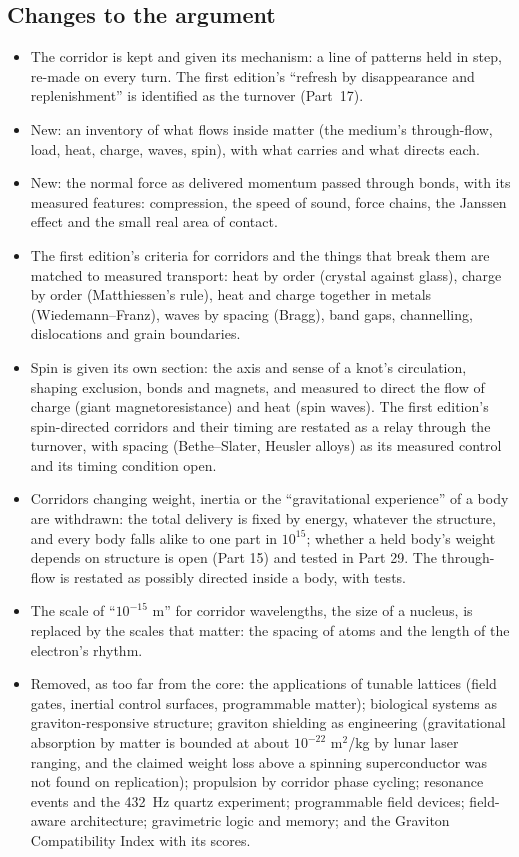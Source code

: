 \documentclass[11pt,a4paper]{article}
\begin{document}
\subsection*{Changes to the argument}
\begin{itemize}
\item The corridor is kept and given its mechanism: a line of patterns held in step, re-made on every turn. The first edition's ``refresh by disappearance and replenishment'' is identified as the turnover (Part~17).
\item New: an inventory of what flows inside matter (the medium's through-flow, load, heat, charge, waves, spin), with what carries and what directs each.
\item New: the normal force as delivered momentum passed through bonds, with its measured features: compression, the speed of sound, force chains, the Janssen effect and the small real area of contact.
\item The first edition's criteria for corridors and the things that break them are matched to measured transport: heat by order (crystal against glass), charge by order (Matthiessen's rule), heat and charge together in metals (Wiedemann--Franz), waves by spacing (Bragg), band gaps, channelling, dislocations and grain boundaries.
\item Spin is given its own section: the axis and sense of a knot's circulation, shaping exclusion, bonds and magnets, and measured to direct the flow of charge (giant magnetoresistance) and heat (spin waves). The first edition's spin-directed corridors and their timing are restated as a relay through the turnover, with spacing (Bethe--Slater, Heusler alloys) as its measured control and its timing condition open.
\item Corridors changing weight, inertia or the ``gravitational experience'' of a body are withdrawn: the total delivery is fixed by energy, whatever the structure, and every body falls alike to one part in $10^{15}$; whether a held body's weight depends on structure is open (Part 15) and tested in Part 29. The through-flow is restated as possibly directed inside a body, with tests.
\item The scale of ``$10^{-15}$ m'' for corridor wavelengths, the size of a nucleus, is replaced by the scales that matter: the spacing of atoms and the length of the electron's rhythm.
\item Removed, as too far from the core: the applications of tunable lattices (field gates, inertial control surfaces, programmable matter); biological systems as graviton-responsive structure; graviton shielding as engineering (gravitational absorption by matter is bounded at about $10^{-22}$ m$^2$/kg by lunar laser ranging, and the claimed weight loss above a spinning superconductor was not found on replication); propulsion by corridor phase cycling; resonance events and the 432~Hz quartz experiment; programmable field devices; field-aware architecture; gravimetric logic and memory; and the Graviton Compatibility Index with its scores.
\end{itemize}
\end{document}
